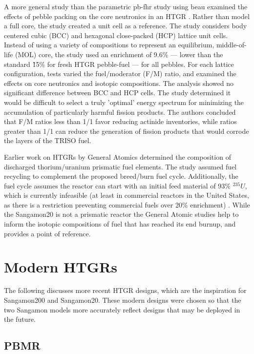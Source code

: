 A more general study than the parametric \acrshort{pb-fhr} study using \acrshort{beau} examined the effects of pebble packing on the core neutronics in an HTGR \cite{turkmen_effect_2012}.  Rather than model a full core, the study created a unit cell as a reference.  The study considers body centered cubic (BCC) and hexagonal close-packed (HCP) lattice unit cells.  Instead of using a variety of compositions to represent an equilibrium, middle-of-life (MOL) core, the study used an enrichment of 9.6\%  --- lower than the standard \~15\% for fresh HTGR pebble-fuel --- for all pebbles.  For each lattice configuration, tests varied the fuel/moderator (F/M) ratio, and examined the effects on core neutronics and isotopic compositions.  The analysis showed no significant difference between BCC and HCP cells.  The study determined it would be difficult to select a truly 'optimal' energy spectrum for minimizing the accumulation of particularly harmful fission products.  The authors concluded that F/M ratios less than 1/1 favor reducing actinide inventories, while ratios greater than 1/1 can reduce the generation of fission products that would corrode the layers of the TRISO fuel.

Earlier work on HTGRs by General Atomics determined the composition of discharged thorium/uranium prismatic fuel elements.  The study assumed fuel recycling to complement the proposed breed/burn fuel cycle.  Additionally, the fuel cycle assumes the reactor can start with an initial feed material of 93\% $^{235}U$, which is currently infeasible (at least in commercial reactors in the United States, as there is a restriction preventing commercial fuels over 20\% enrichment) \cite{hamilton_htgr_1976}.  While the Sangamon20 is not a prismatic reactor the General Atomic studies help to inform the isotopic compositions of fuel that has reached its end burnup, and provides a point of reference.


\section{Modern HTGRs}
\label{sec:modern}

The following discusses more recent HTGR designs, which are the inspiration for Sangamon200 and Sangamon20.  These modern designs were chosen so that the two Sangamon models more accurately reflect designs that may be deployed in the future.

\subsection{PBMR}

